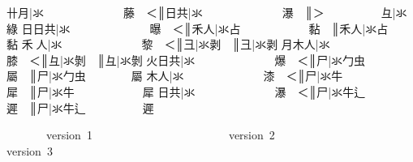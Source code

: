 {\cjk{}{\cnsym{}　　　}卄月}|{\cjk{}氺{\cnsym{}　　　　　　　}藤{\cnsym{}　}＜}║{\cjk{}{\cnsym{}　　　　}日共}|{\cjk{}氺{\cnsym{}　　　　　　　}瀑{\cnsym{}　}}║{\cjk{}＞{\cnsym{}　　　　　}彑}|{\cjk{}氺{\cnsym{}　　　　　　　}綠} 
{\cjk{}{\cnsym{}　　　}日日共}|{\cjk{}氺{\cnsym{}　　　　　　　}曝{\cnsym{}　}＜}║{\cjk{}{\cnsym{}　　　　　}禾人}|{\cjk{}氺占{\cnsym{}　　　　　　}黏{\cnsym{}　}}║{\cjk{}{\cnsym{}　　　　　　}禾人}|{\cjk{}氺占{\cnsym{}　　　　　　}黏} 
{\cjk{}{\cnsym{}　　　}禾{\cnjzr{}}人}|{\cjk{}氺{\cnsym{}　　　　　　　}黎{\cnsym{}　}＜}║{\cjk{}{\cnsym{}　　　　　　}彐}|{\cjk{}氺剥{\cnsym{}　}}║{\cjk{}{\cnsym{}　　　　　　　}彐}|{\cjk{}氺剥} 
{\cjk{}{\cnsym{}　　　}月木人}|{\cjk{}氺{\cnsym{}　　　　　　　}膝{\cnsym{}　}＜}║{\cjk{}{\cnsym{}　　　　　　}彑}|{\cjk{}氺剝{\cnsym{}　}}║{\cjk{}{\cnsym{}　　　　　　　}彑}|{\cjk{}氺剝} 
{\cjk{}{\cnsym{}　　　}火日共}|{\cjk{}氺{\cnsym{}　　　　　　　}爆{\cnsym{}　}＜}║{\cjk{}{\cnsym{}　　　　　　}尸}|{\cjk{}氺勹虫{\cnsym{}　　　　}屬{\cnsym{}　}}║{\cjk{}{\cnsym{}　　　　　　　}尸}|{\cjk{}氺勹虫{\cnsym{}　　　　}屬} 
{\cjk{}{\cnsym{}　　　}木人}|{\cjk{}氺{\cnsym{}　　　　　　　}漆{\cnsym{}　}＜}║{\cjk{}{\cnsym{}　　　　　　}尸}|{\cjk{}氺牛{\cnsym{}　　　　　　}犀{\cnsym{}　}}║{\cjk{}{\cnsym{}　　　　　　　}尸}|{\cjk{}氺牛{\cnsym{}　　　　　　}犀} 
{\cjk{}{\cnsym{}　　　}日共}|{\cjk{}氺{\cnsym{}　　　　　　　}瀑{\cnsym{}　}＜}║{\cjk{}{\cnsym{}　　　　　　}尸}|{\cjk{}氺牛辶{\cnsym{}　　　　　}遲{\cnsym{}　}}║{\cjk{}{\cnsym{}　　　　　　　}尸}|{\cjk{}氺牛辶{\cnsym{}　　　　　}遲} 
\endgroup{}{}

\endgroup{}\begin{multicols}{2}\end{multicols}\begingroup\mktsObeyAllLines{}

\begingroup\mktsStyleCode{}       version 1                        version 2                        version 3

